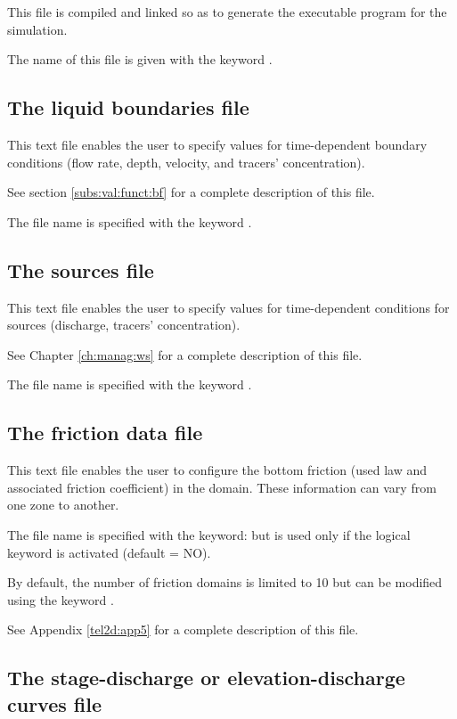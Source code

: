 This file is compiled and linked so as to generate the executable program
for the simulation.

The name of this file is given with the keyword .


\subsection{The liquid boundaries file}

This text file enables the user to specify values for time-dependent boundary
conditions (flow rate, depth, velocity, and tracers' concentration).

See section \ref{subs:val:funct:bf} for a complete description of this file.

The file name is specified with the keyword .


\subsection{The sources file}

This text file enables the user to specify values for time-dependent conditions
for sources (discharge, tracers' concentration).

See Chapter \ref{ch:manag:ws} for a complete description of this file.

The file name is specified with the keyword .


\subsection{The friction data file}

This text file enables the user to configure the bottom friction
(used law and associated friction coefficient) in the domain.
These information can vary from one zone to another.

The file name is specified with the keyword: 
but is used only if the logical keyword  is activated
(default = NO).

By default, the number of friction domains is limited to 10 but can be modified
using the keyword .

See Appendix \ref{tel2d:app5} for a complete description of this file.


\subsection{The stage-discharge or elevation-discharge curves file}

